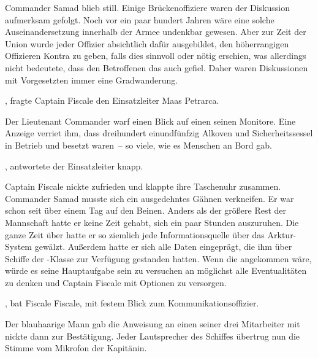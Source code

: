 Commander Samad blieb still. Einige Brückenoffiziere waren der Diskussion aufmerksam gefolgt. Noch vor ein paar hundert Jahren wäre eine solche Auseinandersetzung innerhalb der Armee undenkbar gewesen. Aber zur Zeit der Union wurde jeder Offizier absichtlich dafür ausgebildet, den höherrangigen Offizieren Kontra zu geben, falls dies sinnvoll oder nötig erschien, was allerdings nicht bedeutete, dass den Betroffenen das auch gefiel. Daher waren Diskussionen mit Vorgesetzten immer eine Gradwanderung.

\par

, fragte Captain Fiscale den Einsatzleiter Maas Petrarca.

\par

Der Lieutenant Commander warf einen Blick auf einen seinen Monitore. Eine Anzeige verriet ihm, dass dreihundert einundfünfzig Alkoven und Sicherheitssessel in Betrieb und besetzt waren~-- so viele, wie es Menschen an Bord gab.

\par

, antwortete der Einsatzleiter knapp.

\par

Captain Fiscale nickte zufrieden und klappte ihre Taschenuhr zusammen. Commander Samad musste sich ein ausgedehntes Gähnen verkneifen. Er war schon seit über einem Tag auf den Beinen. Anders als der größere Rest der Mannschaft hatte er keine Zeit gehabt, sich ein paar Stunden auszuruhen. Die ganze Zeit über hatte er so ziemlich jede Informationsquelle über das Arktur-System gewälzt. Außerdem hatte er sich alle Daten eingeprägt, die ihm über Schiffe der -Klasse zur Verfügung gestanden hatten. Wenn die  angekommen wäre, würde es seine Hauptaufgabe sein zu versuchen an möglichst alle Eventualitäten zu denken und Captain Fiscale mit Optionen zu versorgen.

\par

, bat Fiscale Fiscale, mit festem Blick zum Kommunikationsoffizier.

\par

Der blauhaarige Mann gab die Anweisung an einen seiner drei Mitarbeiter mit nickte dann zur Bestätigung. Jeder Lautsprecher des Schiffes übertrug nun die Stimme vom Mikrofon der Kapitänin.

